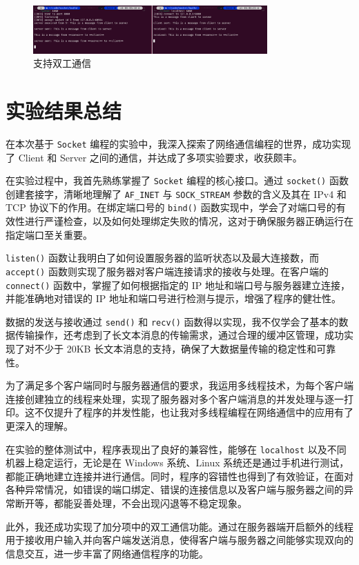 \documentclass{article}
\begin{document}
\begin{figure}[H]
    \centering
    \includegraphics[width=0.8\textwidth]{img/9.png}
    \caption{支持双工通信}
\end{figure}

\section{实验结果总结}

在本次基于 \texttt{Socket} 编程的实验中，我深入探索了网络通信编程的世界，成功实现了 Client 和 Server 之间的通信，并达成了多项实验要求，收获颇丰。

在实验过程中，我首先熟练掌握了 \texttt{Socket} 编程的核心接口。通过 \texttt{socket()} 函数创建套接字，清晰地理解了 \texttt{AF\_INET} 与 \texttt{SOCK\_STREAM} 参数的含义及其在 IPv4 和 TCP 协议下的作用。在绑定端口号的 \texttt{bind()} 函数实现中，学会了对端口号的有效性进行严谨检查，以及如何处理绑定失败的情况，这对于确保服务器正确运行在指定端口至关重要。

\texttt{listen()} 函数让我明白了如何设置服务器的监听状态以及最大连接数，而 \texttt{accept()} 函数则实现了服务器对客户端连接请求的接收与处理。在客户端的 \texttt{connect()} 函数中，掌握了如何根据指定的 IP 地址和端口号与服务器建立连接，并能准确地对错误的 IP 地址和端口号进行检测与提示，增强了程序的健壮性。

数据的发送与接收通过 \texttt{send()} 和 \texttt{recv()} 函数得以实现，我不仅学会了基本的数据传输操作，还考虑到了长文本消息的传输需求，通过合理的缓冲区管理，成功实现了对不少于 20KB 长文本消息的支持，确保了大数据量传输的稳定性和可靠性。

为了满足多个客户端同时与服务器通信的要求，我运用多线程技术，为每个客户端连接创建独立的线程来处理，实现了服务器对多个客户端消息的并发处理与逐一打印。这不仅提升了程序的并发性能，也让我对多线程编程在网络通信中的应用有了更深入的理解。

在实验的整体测试中，程序表现出了良好的兼容性，能够在 \texttt{localhost} 以及不同机器上稳定运行，无论是在 Windows 系统、Linux 系统还是通过手机进行测试，都能正确地建立连接并进行通信。同时，程序的容错性也得到了有效验证，在面对各种异常情况，如错误的端口绑定、错误的连接信息以及客户端与服务器之间的异常断开等，都能妥善处理，不会出现闪退等不稳定现象。

此外，我还成功实现了加分项中的双工通信功能。通过在服务器端开启额外的线程用于接收用户输入并向客户端发送消息，使得客户端与服务器之间能够实现双向的信息交互，进一步丰富了网络通信程序的功能。
\end{document}
